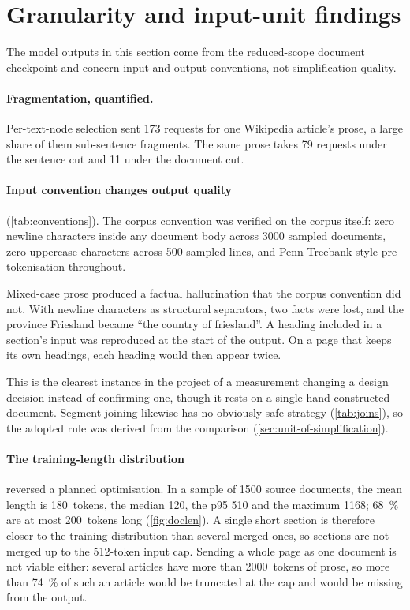 \section{Granularity and input-unit findings}
\label{sec:granularity-findings}

The model outputs in this section come from the reduced-scope document checkpoint and concern input and output conventions, not simplification quality.

\paragraph{Fragmentation, quantified.}
Per-text-node selection sent \num{173} requests for one Wikipedia article's prose, a large share of them sub-sentence fragments.
The same prose takes 79 requests under the sentence cut and 11 under the document cut.

\paragraph{Input convention changes output quality} (\cref{tab:conventions}).
The corpus convention was verified on the corpus itself: zero newline characters inside any document body across \num{3000} sampled documents, zero uppercase characters across \num{500} sampled lines, and Penn-Treebank-style pre-tokenisation throughout.

Mixed-case prose produced a factual hallucination that the corpus convention did not.
With newline characters as structural separators, two facts were lost, and the province Friesland became ``the country of friesland''.
A heading included in a section's input was reproduced at the start of the output.
On a page that keeps its own headings, each heading would then appear twice.

This is the clearest instance in the project of a measurement changing a design decision instead of confirming one, though it rests on a single hand-constructed document.
Segment joining likewise has no obviously safe strategy (\cref{tab:joins}), so the adopted rule was derived from the comparison (\cref{sec:unit-of-simplification}).

\paragraph{The training-length distribution} reversed a planned optimisation.
In a sample of \num{1500} source documents, the mean length is \num{180}~tokens, the median \num{120}, the \gls{p95} \num{510} and the maximum \num{1168}; \qty{68}{\percent} are at most \num{200}~tokens long (\cref{fig:doclen}).
A single short section is therefore closer to the training distribution than several merged ones, so sections are not merged up to the \num{512}-token input cap.
Sending a whole page as one document is not viable either: several articles have more than \num{2000}~tokens of prose, so more than \qty{74}{\percent} of such an article would be truncated at the cap and would be missing from the output.

